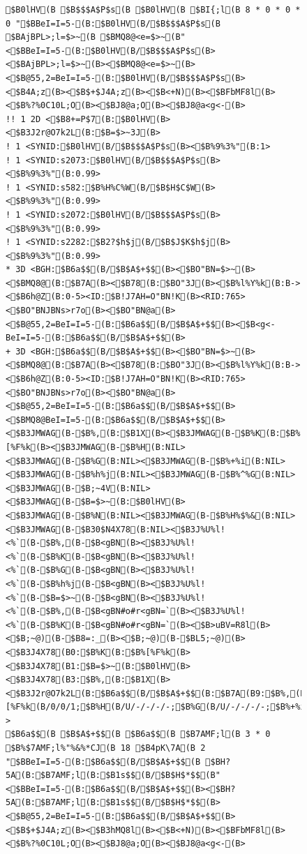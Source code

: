 \documentclass[a4j]{jarticle}
\begin{document}
{\begin{figure}[t]
\begin{center}
\begin{minipage}{\hsize}
\begin{verbatim}
$B0lHV(B $B$$$A$P$s(B $B0lHV(B $BI{;l(B 8 * 0 * 0 * 0 "$BBeI=I=5-(B:$B0lHV(B/$B$$$A$P$s(B $BAjBPL>;l=$>~(B $BMQ8@<e=$>~(B" <$BBeI=I=5-(B:$B0lHV(B/$B$$$A$P$s(B><$BAjBPL>;l=$>~(B><$BMQ8@<e=$>~(B><$B@55,2=BeI=I=5-(B:$B0lHV(B/$B$$$A$P$s(B><$B4A;z(B><$B$+$J4A;z(B><$B<+N)(B><$BFbMF8l(B><$B%?%0C10L;O(B><$BJ8@a;O(B><$BJ8@a<g<-(B>
!! 1 2D <$B8+=P$7(B:$B0lHV(B><$B3J2r@O7k2L(B:$B=$>~3J(B>
! 1 <SYNID:$B0lHV(B/$B$$$A$P$s(B><$B%9%3%"(B:1>
! 1 <SYNID:s2073:$B0lHV(B/$B$$$A$P$s(B><$B%9%3%"(B:0.99>
! 1 <SYNID:s582:$B%H%C%W(B/$B$H$C$W(B><$B%9%3%"(B:0.99>
! 1 <SYNID:s2072:$B0lHV(B/$B$$$A$P$s(B><$B%9%3%"(B:0.99>
! 1 <SYNID:s2282:$B2?$h$j(B/$B$J$K$h$j(B><$B%9%3%"(B:0.99>
* 3D <BGH:$B6a$$(B/$B$A$+$$(B><$BO"BN=$>~(B><$BMQ8@(B:$B7A(B><$B78(B:$BO"3J(B><$B%l%Y%k(B:B-><$B6h@Z(B:0-5><ID:$B!J7AH=O"BN!K(B><RID:765><$BO"BNJBNs>r7o(B><$BO"BN@a(B><$B@55,2=BeI=I=5-(B:$B6a$$(B/$B$A$+$$(B><$B<g<-BeI=I=5-(B:$B6a$$(B/$B$A$+$$(B>
+ 3D <BGH:$B6a$$(B/$B$A$+$$(B><$BO"BN=$>~(B><$BMQ8@(B:$B7A(B><$B78(B:$BO"3J(B><$B%l%Y%k(B:B-><$B6h@Z(B:0-5><ID:$B!J7AH=O"BN!K(B><RID:765><$BO"BNJBNs>r7o(B><$BO"BN@a(B><$B@55,2=BeI=I=5-(B:$B6a$$(B/$B$A$+$$(B><$BMQ8@BeI=I=5-(B:$B6a$$(B/$B$A$+$$(B><$B3JMWAG(B-$B%,(B:$B1X(B><$B3JMWAG(B-$B%K(B:$B%[%F%k(B><$B3JMWAG(B-$B%H(B:NIL><$B3JMWAG(B-$B%G(B:NIL><$B3JMWAG(B-$B%+%i(B:NIL><$B3JMWAG(B-$B%h%j(B:NIL><$B3JMWAG(B-$B%^%G(B:NIL><$B3JMWAG(B-$B;~4V(B:NIL><$B3JMWAG(B-$B=$>~(B:$B0lHV(B><$B3JMWAG(B-$B%N(B:NIL><$B3JMWAG(B-$B%H%$%&(B:NIL><$B3JMWAG(B-$B30$N4X78(B:NIL><$B3J%U%l!<%`(B-$B%,(B-$B<gBN(B><$B3J%U%l!<%`(B-$B%K(B-$B<gBN(B><$B3J%U%l!<%`(B-$B%G(B-$B<gBN(B><$B3J%U%l!<%`(B-$B%h%j(B-$B<gBN(B><$B3J%U%l!<%`(B-$B=$>~(B-$B<gBN(B><$B3J%U%l!<%`(B-$B%,(B-$B<gBN#o#r<gBN=`(B><$B3J%U%l!<%`(B-$B%K(B-$B<gBN#o#r<gBN=`(B><$B>uBV=R8l(B><$B;~@)(B-$B8=:_(B><$B;~@)(B-$BL5;~@)(B><$B3J4X78(B0:$B%K(B:$B%[%F%k(B><$B3J4X78(B1:$B=$>~(B:$B0lHV(B><$B3J4X78(B3:$B%,(B:$B1X(B><$B3J2r@O7k2L(B:$B6a$$(B/$B$A$+$$(B:$B7A(B9:$B%,(B/N/$B1X(B/3/0/1;$B%K(B/C/$B%[%F%k(B/0/0/1;$B%H(B/U/-/-/-/-;$B%G(B/U/-/-/-/-;$B%+%i(B/U/-/-/-/-;$B%h%j(B/U/-/-/-/-;$B%^%G(B/U/-/-/-/-;$B;~4V(B/U/-/-/-/-;$B=$>~(B/C/$B0lHV(B/1/0/1;$B%N(B/U/-/-/-/-;$B%H%$%&(B/U/-/-/-/-;$B30$N4X78(B/U/-/-/-/->
$B6a$$(B $B$A$+$$(B $B6a$$(B $B7AMF;l(B 3 * 0 $B%$7AMF;l%"%&%*CJ(B 18 $B4pK\7A(B 2 "$BBeI=I=5-(B:$B6a$$(B/$B$A$+$$(B $BH?5A(B:$B7AMF;l(B:$B1s$$(B/$B$H$*$$(B" <$BBeI=I=5-(B:$B6a$$(B/$B$A$+$$(B><$BH?5A(B:$B7AMF;l(B:$B1s$$(B/$B$H$*$$(B><$B@55,2=BeI=I=5-(B:$B6a$$(B/$B$A$+$$(B><$B$+$J4A;z(B><$B3hMQ8l(B><$B<+N)(B><$BFbMF8l(B><$B%?%0C10L;O(B><$BJ8@a;O(B><$BJ8@a<g<-(B>

\end{verbatim}
\end{minipage}
\end{center}
\end{figure}}
\end{document}
